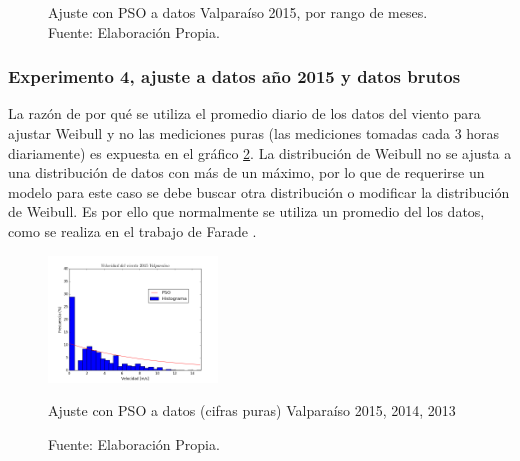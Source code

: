 \begin{figure}[ht!]
{    }%
    \caption{Ajuste con PSO a datos Valparaíso 2015, por rango de meses.\\ Fuente: Elaboración Propia.}
    \label{fig:subfigures}
\end{figure}

\subsubsection{Experimento 4, ajuste a datos año 2015 y datos brutos}
La razón de por qué se utiliza el promedio diario de los datos del viento para ajustar Weibull y no las mediciones puras (las mediciones tomadas cada 3 horas diariamente) es expuesta en el gráfico \ref{fig:pso_valpo_15_all_data}. La distribución de Weibull no se ajusta a una distribución de datos con más de un máximo, por lo que de requerirse un modelo para este caso se debe buscar otra distribución o modificar la distribución de Weibull. Es por ello que normalmente se utiliza un promedio del los datos, como se realiza en el trabajo de Farade \cite{Fadare08}.

\begin{figure}[ht!]
    \centering
    \includegraphics[width=0.4\textwidth]{figures/result_2015_all_data.png}
    \caption{Ajuste con PSO a datos (cifras puras) Valparaíso 2015, 2014, 2013}
    \vspace{-.25cm}
    \caption*{Fuente: Elaboración Propia.}
    \label{fig:pso_valpo_15_all_data}
\end{figure}

